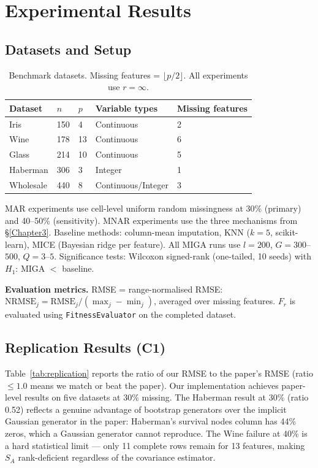 
\chapter{Experimental Results}
\label{Chapter4}

\section{Datasets and Setup}

\begin{table}[h]
\caption{Benchmark datasets. Missing features = $\lfloor p/2 \rfloor$. All experiments use $r = \infty$.}
\label{tab:datasets}
\centering
\begin{tabular}{lllll}
\toprule
\textbf{Dataset} & $n$ & $p$ & \textbf{Variable types} & \textbf{Missing features} \\
\midrule
Iris      & 150 & 4  & Continuous       & 2 \\
Wine      & 178 & 13 & Continuous       & 6 \\
Glass     & 214 & 10 & Continuous       & 5 \\
Haberman  & 306 & 3  & Integer          & 1 \\
Wholesale & 440 & 8  & Continuous/Integer & 3 \\
\bottomrule
\end{tabular}
\end{table}

MAR experiments use cell-level uniform random missingness at 30\% (primary) and 40--50\% (sensitivity). MNAR experiments use the three mechanisms from \S\ref{Chapter3}. Baseline methods: column-mean imputation, KNN ($k=5$, scikit-learn), MICE (Bayesian ridge per feature). All MIGA runs use $l=200$, $G=300$--$500$, $Q=3$--$5$. Significance tests: Wilcoxon signed-rank (one-tailed, 10 seeds) with $H_1$: MIGA $<$ baseline.

\textbf{Evaluation metrics.} RMSE = range-normalised RMSE: $\text{NRMSE}_j = \text{RMSE}_j / (\max_j - \min_j)$, averaged over missing features. $F_r$ is evaluated using \texttt{FitnessEvaluator} on the completed dataset.

\section{Replication Results (C1)}
\label{sec:replication}

Table~\ref{tab:replication} reports the ratio of our RMSE to the paper's RMSE (ratio $\leq 1.0$ means we match or beat the paper). Our implementation achieves paper-level results on five datasets at 30\% missing. The Haberman result at 30\% (ratio 0.52) reflects a genuine advantage of bootstrap generators over the implicit Gaussian generator in the paper: Haberman's survival nodes column has 44\% zeros, which a Gaussian generator cannot reproduce. The Wine failure at 40\% is a hard statistical limit --- only 11 complete rows remain for 13 features, making $S_A$ rank-deficient regardless of the covariance estimator.

